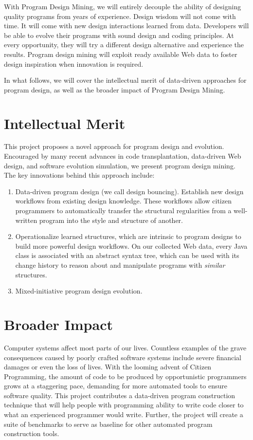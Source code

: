 With Program Design Mining, we will entirely decouple the ability of 
designing quality programs from years of experience. Design wisdom will 
not come with time. It will come with new design interactions learned 
from data. Developers will be able to evolve their programs with 
sound design and coding principles. At every opportunity, they will try 
a different design alternative and experience the results. Program design 
mining will exploit ready available Web data to foster design inspiration 
when innovation is required.

In what follows, we will cover the intellectual merit of data-driven 
approaches for program design, as well as the broader impact of Program 
Design Mining.

\section*{Intellectual Merit} %
\label{sec:merit}

This project proposes a novel approach for program design and 
evolution. Encouraged by many recent advances in code transplantation, 
data-driven Web design, and software evolution simulation, we 
present program design mining. The key innovations behind this 
approach include:

\begin{enumerate}
	\item Data-driven program design (we call design bouncing). Establish 
	new design workflows from existing design knowledge. These workflows 
	allow citizen programmers to automatically transfer the structural 
	regularities from a well-written program into the style and structure 
	of another.  
	\item Operationalize learned structures, which are intrinsic to program 
	designs to build more powerful design workflows. On our collected Web 
	data, every Java class is associated with an abstract syntax tree, 
	which can be used with its change history to reason about and 
	manipulate programs with \textit{similar} structures.
	\item Mixed-initiative program design evolution.     
\end{enumerate}

\section*{Broader Impact} %
\label{sec:impact}

Computer systems affect most parts of our lives. Countless examples of 
the grave consequences caused by poorly crafted software systems include 
severe financial damages or even the loss of lives. With the looming 
advent of Citizen Programming, the amount of code to be produced by 
opportunistic programmers grows at a staggering pace, demanding for more 
automated tools to ensure software quality. This project contributes a 
data-driven program construction technique that will help people with 
programming ability to write code closer to what an experienced programmer 
would write. Further, the project will create a suite of benchmarks to 
serve as baseline for other automated program construction tools.

